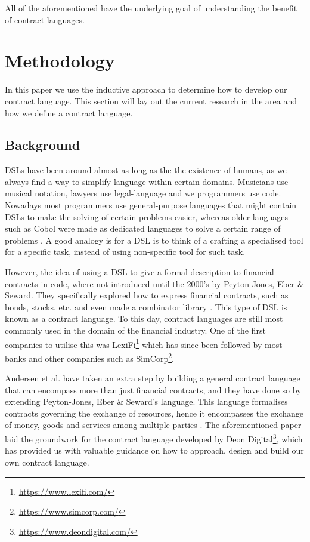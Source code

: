 \documentclass{ituthesis}
\begin{document}
All of the aforementioned have the underlying goal of understanding the benefit of contract languages.


\chapter{Methodology}


In this paper we use the inductive approach to determine how to develop our contract language. This section will lay out the current research in the area and how we define a contract language.

\section{Background}
DSLs have been around almost as long as the the existence of humans, as we always find a way to simplify language within certain domains. Musicians use musical notation, lawyers use legal-language and we programmers use code. Nowadays most programmers use general-purpose languages that might contain DSLs to make the solving of certain problems easier, whereas older languages such as Cobol were made as dedicated languages to solve a certain range of problems \cite{van2000domain}. A good analogy is for a DSL is to think of a crafting a specialised tool for a specific task, instead of using non-specific tool for such task.

However, the idea of using a DSL to give a formal description to financial contracts in code, where not introduced until the 2000's by Peyton-Jones, Eber \& Seward. They specifically explored how to express financial contracts, such as bonds, stocks, etc. and even made a combinator library \cite{peyton2000composing}. This type of DSL is known as a contract language. To this day, contract languages are still most commonly used in the domain of the financial industry. One of the first companies to utilise this was LexiFi\footnote{\url{https://www.lexifi.com/}} which has since been followed by most banks and other companies such as SimCorp\footnote{\url{https://www.simcorp.com/}}.

Andersen et al. have taken an extra step by building a general contract language that can encompass more than just financial contracts, and they have done so by extending Peyton-Jones, Eber \& Seward's language. This language formalises contracts governing the exchange of resources, hence it encompasses the exchange of money, goods and services among multiple parties \cite{andersen2006compositional}. The aforementioned paper laid the groundwork for the contract language developed by Deon Digital\footnote{\url{https://www.deondigital.com/}}, which has provided us with valuable guidance on how to approach, design and build our own contract language.
\end{document}
